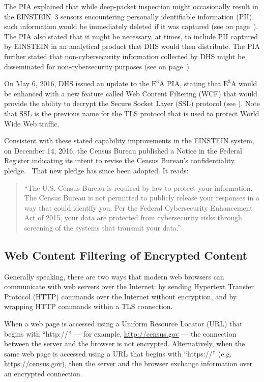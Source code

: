 \documentclass[fleqn,10pt]{wlscirep}
\newcommand{\ETA}{$\textrm{E}^\textrm{3}\textrm{A}$\xspace}
\begin{document}
The PIA explained that while deep-packet inspection might occasionally
result in the EINSTEIN~3 sensors encountering personally identifiable
information (PII), such information would be immediately deleted if it
was captured (see  on page~\pageref{excerpt1}). The PIA also stated that it
might be necessary, at times, to include PII captured by EINSTEIN in
an analytical product that DHS would then distribute. The PIA further
stated that non-cybersecurity information collected by DHS might be
disseminated for non-cybersecurity purposes (see  on
page~\pageref{excerpt3}).

On May 6, 2016, DHS issued an update to the \ETA PIA, stating that \ETA
would be enhanced with a new feature called Web Content
Filtering (WCF) that would provide the ability to decrypt
the Secure Socket Layer (SSL) protocol (see ). Note
that SSL
is the previous name for the TLS protocol that is
used to protect World Wide Web traffic.

Consistent with these stated capability improvements in the EINSTEIN
system, on December 14, 2016, the Census Bureau published a Notice in
the Federal Register indicating its intent to revise the
Census Bureau's confidentiality
pledge.~\cite{federal-register-2016-12-14} That new pledge has since
been adopted. It reads:

\begin{quote}
  ``The U.S. Census Bureau is required by law to protect your
  information. The Census Bureau is not permitted to publicly release
  your responses in a way that could identify you. Per the Federal
  Cybersecurity Enhancement Act of 2015, your data are protected from
  cybersecurity risks through screening of the systems that transmit
  your data.''~\cite{federal-register-2016-12-14,pledge}
\end{quote}

\subsection{Web Content Filtering of Encrypted Content}

Generally speaking, there are two ways that modern web browsers can
communicate with web servers over the Internet: by sending Hypertext
Transfer Protocol (HTTP) commands over the Internet without
encryption, and by wrapping HTTP commands within a TLS connection.

When a web page is accessed using a Uniform Resource Locator
(URL) that begins with ``http://'' --- for example,
\url{http://census.gov} --- the connection between the server and the
browser is not encrypted. Alternatively, when the same web page is
accessed using a URL that begins with ``https://''
(e.g. \url{https://census.gov}), then the server and the browser
exchange information over an encrypted connection.
\end{document}
